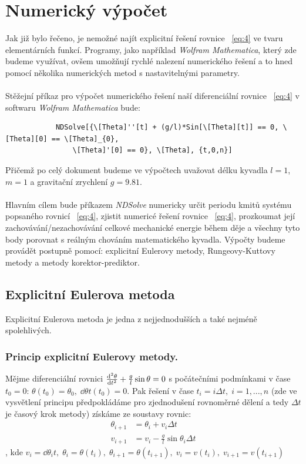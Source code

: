 \documentclass[reqno, a4paper]{amsart}
\begin{document}
		\section{Numerický výpočet}
		Jak již bylo řečeno, je nemožné najít explicitní řešení rovnice ~\eqref{eq:4} ve tvaru elementárních funkcí. Programy, jako například \textit{Wolfram Mathematica}, který zde budeme využívat, ovšem umožňují rychlé nalezení numerického řešení a to hned pomocí několika numerických metod s nastavitelnými parametry.\
		\\
		\\
		Stěžejní příkaz pro výpočet numerického řešení naší diferenciální rovnice ~\eqref{eq:4} v softwaru \textit{Wolfram Mathematica} bude:
		\begin{verbatim}
			NDSolve[{\[Theta]''[t] + (g/l)*Sin[\[Theta][t]] == 0, \[Theta][0] == \[Theta]_{0}, 
				\[Theta]'[0] == 0}, \[Theta], {t,0,n}]
		\end{verbatim}
		Přičemž po celý dokument budeme ve výpočtech uvažovat délku kyvadla $ l=1 $, $ m=1 $ a gravitační zrychlení $ g=9.81 $.
		\\
		\\
		Hlavním cílem bude příkazem \textit{NDSolve} numericky určit periodu kmitů systému popsaného rovnicí ~\eqref{eq:4}, zjistit numericé řešení rovnice ~\eqref{eq:4}, prozkoumat její zachovávání/nezachovávání celkové mechanické energie během děje a všechny tyto body porovnat s reálným chováním matematického kyvadla. Výpočty budeme provádět postupně pomocí: explicitní Eulerovy metody, Rungeovy-Kuttovy metody a metody korektor-prediktor.
		\subsection{Explicitní Eulerova metoda}
		Explicitní Eulerova metoda je jedna z nejjednodušších a také nejméně spolehlivých.
		\\
		\subsubsection{Princip explicitní Eulerovy metody.} Mějme diferenciální rovnici $\frac{\mathrm{d}^2 {\theta}}{\mathrm{d} {t}^2} + \frac{g}{l} \sin \theta = 0$ s počátečními podmínkami v čase $t_{0}=0$: $\theta(t_{0})=\theta_{0},\; \dd{\theta}{t}(t_{0})=0$. Pak řešení v čase $t_{i}=i\Delta t,\; i=1,...,n$ (zde ve vysvětlení principu předpokládáme pro zjednodušení rovnoměrné dělení a tedy $ \Delta t$ je časový krok metody) získáme ze soustavy rovnic: 
		\begin{align}
			\theta_{i+1}& =\theta_{i}+v_{i}\Delta t\\
			v_{i+1}& =v_{i}-\frac{g}{l}\sin\theta_{i}\Delta t
		\end{align}
		, kde $ v_{i}=\dd{\theta_{i}}{t},\; \theta_{i}=\theta(t_{i}),\;\theta_{i+1}=\theta(t_{i+1}),\;v_{i}=v(t_{i}),\;v_{i+1}=v(t_{i+1})$
		\\
\end{document}

